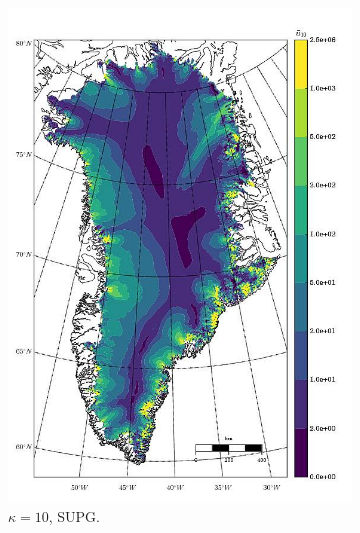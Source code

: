 \begin{figure}
\begin{subfigure}[b]{0.25\linewidth}
    \includegraphics[width=\linewidth]{images/balance_velocity/greenland/Ubar_5H_kappa_10_SUPG.jpg}
  \caption{$\kappa = 10$, SUPG.}
  \label{greenland_bv_image_kappa_10_SUPG}
  \end{subfigure}
  \begin{subfigure}[b]{0.25\linewidth}

\end{subfigure}
\end{figure}
